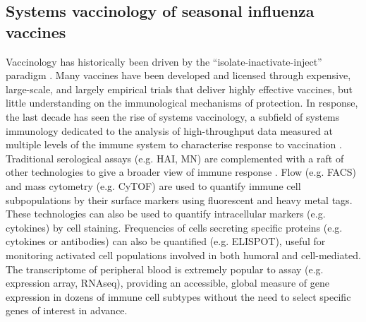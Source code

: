 \subsection{Systems vaccinology of seasonal influenza vaccines}

Vaccinology has historically been driven by the \enquote{isolate-inactivate-inject} paradigm \autocite{degregorio2014EmpiricismRationalDesign}.
Many vaccines have been developed and licensed through expensive, large-scale, and largely empirical trials that deliver highly effective vaccines, 
but little understanding on the immunological mechanisms of protection.
In response, the last decade has seen the rise of systems vaccinology, 
a subfield of systems immunology dedicated to the analysis of high-throughput data measured at multiple levels of the immune system to characterise response to vaccination
\autocite{pulendran2010SystemsVaccinology,nakaya2012SystemsVaccinologyLearning,li2013SystemsBiologicalApproaches,pulendran2014SystemsVaccinologyProbing,hagan2015SystemsVaccinologyEnabling,nakaya2015VaccinologyEraHighthroughput,davis2018WillSystemsBiology,raeven2019SystemsVaccinologyBig}.
Traditional serological assays (e.g. \gls{HAI}, \gls{MN}) are complemented with a raft of other technologies to give a broader view of immune response \autocite{nakaya2012SystemsVaccinologyLearning,li2013SystemsBiologicalApproaches,pulendran2014SystemsVaccinologyProbing,davis2018WillSystemsBiology,raeven2019SystemsVaccinologyBig}.
Flow (e.g. \gls{FACS}) and mass cytometry (e.g. \gls{CyTOF}) are used to quantify immune cell subpopulations by their surface markers using fluorescent and heavy metal tags.
These technologies can also be used to quantify intracellular markers (e.g. cytokines) by cell staining.
Frequencies of cells secreting specific proteins (e.g. cytokines or antibodies) can also be quantified (e.g. \gls{ELISPOT}), useful for monitoring activated cell populations involved in both humoral and cell-mediated.
The transcriptome of peripheral blood is extremely popular to assay (e.g. expression array, \gls{RNAseq}), 
providing an accessible, global measure of gene expression in dozens of immune cell subtypes without the need to select specific genes of interest in advance.
